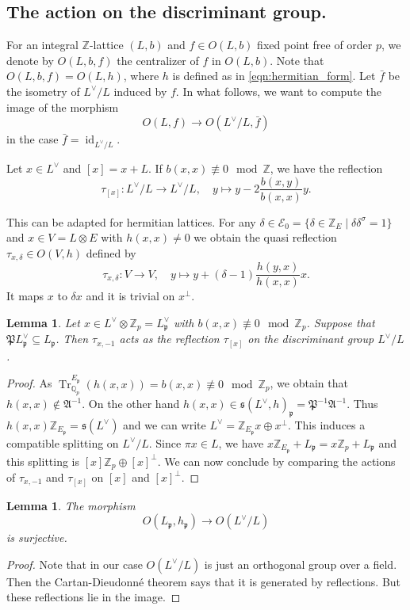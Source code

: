 \documentclass{amsart}
\theoremstyle{definition}
\theoremstyle{plain}
\newtheorem{lemma}[definition]{Lemma}
\DeclareMathOperator{\Tr}{Tr}
\DeclareMathOperator{\id}{id}
\newcommand{\QQ}{\mathbb{Q}}
\newcommand{\ZZ}{\mathbb{Z}}
\newcommand{\disc}[1]{#1^{\vee} \! / #1 }
\begin{document}
\subsection{The action on the discriminant group.}
For an integral $\ZZ$-lattice $(L,b)$ and $f \in O(L,b)$ fixed point free of order $p$, we denote by $O(L,b,f)$ the centralizer of $f$ in $O(L,b)$. Note that $O(L,b,f)= O(L,h)$, where $h$ is defined as in \cref{eqn:hermitian_form}. Let $\bar f$ be the isometry of $\disc{L}$ induced by $f$.
In what follows, we want to compute the image of the morphism
\[O(L,f) \rightarrow O(\disc{L},\bar f) \]
in the case $\bar f = \id_{\disc{L}}$.

Let $x \in L^\vee$ and $[x]=x + L$. If $b(x,x)\not \equiv 0 \mod \ZZ$, we have the reflection
\[\tau_{[x]}\colon L^\vee/L \rightarrow L^\vee/L, \quad y \mapsto
y -2\frac{b(x,y)}{b(x,x)}y.\]

This can be adapted for hermitian lattices.
For any $\delta \in \mathcal{E}_0=\{\delta \in \ZZ_E \mid \delta \delta^\sigma=1\}$ and $x \in V=L\otimes E$ with $h(x,x) \neq 0$ we obtain the quasi reflection
$\tau_{x,\delta} \in O(V,h)$ defined by
\[\tau_{x,\delta}: V \rightarrow V, \quad y\mapsto y + (\delta-1)\frac{h(y,x)}{h(x,x)}x.\]
It maps $x$ to $\delta x$ and it is trivial on $x^\perp$.

\begin{lemma}
 Let $x\in L^\vee\otimes \ZZ_p=L^\vee_\mathfrak{p}$ with $b(x,x) \not \equiv 0 \mod \ZZ_p$.
 Suppose that $\mathfrak{P} L_\mathfrak{p}^\vee \subseteq L_\mathfrak{p}$.
 Then
 $\tau_{x,-1}$ acts as the reflection $\tau_{[x]}$ on the discriminant group $L^\vee/L$.
\end{lemma}
\begin{proof}
 As $\Tr^{E_\mathfrak{p}}_{\QQ_p}(h(x,x)) = b(x,x) \not \equiv 0 \mod \ZZ_p$,
 we obtain that $h(x,x) \not \in \mathfrak{A}^{-1}$.
 On the other hand $h(x,x) \in \mathfrak{s}(L^\vee,h)_\mathfrak{p}= \mathfrak{P}^{-1} \mathfrak{A}^{-1}$.
 Thus $h(x,x)\ZZ_{E_\mathfrak{p}} = \mathfrak{s}(L^\vee)$
 and we can write $L^\vee = \ZZ_{E_\mathfrak{p}} x \oplus x^\perp$.
 This induces a compatible splitting on $\disc{L}$. Since $\pi x \in L$,
 we have $x\ZZ_{E_\mathfrak{p}}+L_\mathfrak{p} = x \ZZ_p+L_\mathfrak{p}$ and this splitting is
 $[x]\ZZ_p \oplus [x]^\perp$. We can now conclude by comparing the actions of $\tau_{x,-1}$ and $\tau_{[x]}$ on
 $[x]$ and $[x]^\perp$.
\end{proof}

\begin{lemma}
 The morphism
 \[O(L_\mathfrak{p},h_\mathfrak{p}) \rightarrow O(\disc{L})\]
 is surjective.
\end{lemma}
\begin{proof}
 Note that in our case $O(\disc{L})$ is just an orthogonal group over a field. Then the Cartan-Dieudonn\'e theorem \cite[Ch.\ 1, Thm.\ 5.4]{scharlau} says that it is generated by reflections. But these reflections lie in the image.
\end{proof}
\end{document}
